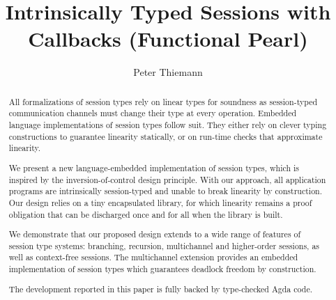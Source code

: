 \documentclass[acmsmall,screen]{acmart}
\begin{document}
\title{Intrinsically Typed Sessions with Callbacks (Functional Pearl)}

\author{Peter Thiemann}


\begin{abstract}
All formalizations of session types rely on linear types for soundness as
session-typed communication channels must change their type at every
operation. Embedded language implementations of session types follow
suit. They either rely on clever typing constructions to guarantee
linearity statically, or on run-time checks that approximate
linearity.

We present a new language-embedded implementation of session types,
which is inspired by the inversion-of-control design principle. With
our approach, all application programs are intrinsically session-typed and
unable to break linearity by construction. Our design relies on a tiny
encapsulated library, for which linearity remains a proof
obligation that can be discharged once and for all when the library is built.

We demonstrate that our proposed design extends to a wide range of
features of session type systems: branching, recursion, multichannel
and higher-order sessions, as well as context-free sessions. The
multichannel extension provides an embedded implementation of
session types which guarantees deadlock freedom by construction.

The development reported in this paper is fully backed by
type-checked Agda code.
\end{abstract}
\end{document}
